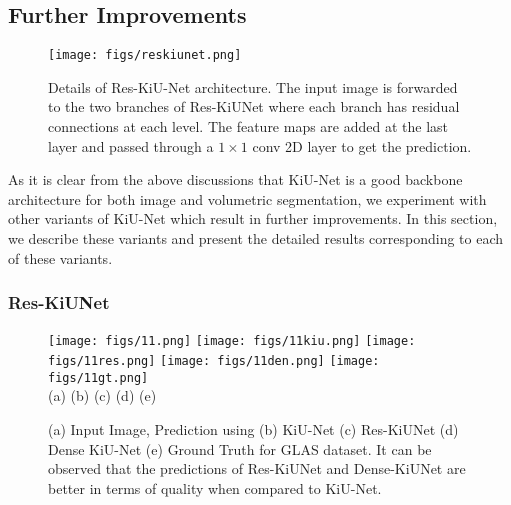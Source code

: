 \documentclass[journal,twoside,web]{ieeecolor}
\begin{document}
\subsection{Further Improvements}

\begin{figure}[htbp]
	\centering
	\texttt{[image: figs/reskiunet.png]}\\
	
	
	\caption{Details of Res-KiU-Net architecture. The input image is forwarded to the two branches of Res-KiUNet where each branch has residual connections at each level. The feature maps are added at the last layer and passed through a $1 \times 1$ conv 2D layer to get the prediction.}
	\label{reskiu}
	
\end{figure}

As it is clear from the above discussions that KiU-Net is a good backbone architecture for both image and volumetric segmentation, we  experiment with other variants of KiU-Net which result in further improvements. In this section, we describe these variants and present the detailed results corresponding to each of these variants. 





\subsubsection{Res-KiUNet}

\begin{figure}[b]
	\begin{center}
		\centering
		\texttt{[image: figs/11.png]}
		\texttt{[image: figs/11kiu.png]}
		\texttt{[image: figs/11res.png]}
		\texttt{[image: figs/11den.png]}
		\texttt{[image: figs/11gt.png]} \\
		(a) \hskip37pt (b) \hskip37pt (c) \hskip37pt(d) \hskip37pt (e)
		\caption{(a) Input Image, Prediction using (b) KiU-Net (c) Res-KiUNet (d) Dense KiU-Net (e) Ground Truth for GLAS dataset. It can be observed that the predictions of Res-KiUNet and Dense-KiUNet are better in terms of quality when compared to KiU-Net.    }
		\label{resden}
	\end{center}
\end{figure}
\end{document}
